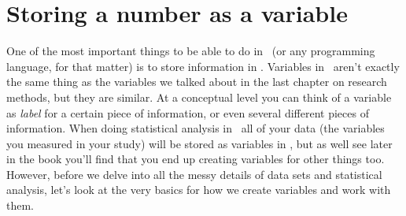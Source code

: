 \section{Storing a number as a variable~\label{sec:assign}}

One of the most important things to be able to do in \R\ (or any programming language, for that matter) is to store information in . Variables in \R\ aren't exactly the same thing as the variables we talked about in the last chapter on research methods, but they are similar. At a conceptual level you can think of a variable as {\it label} for a certain piece of information, or even several different pieces of information. When doing statistical analysis in \R\ all of your data (the variables you measured in your study) will be stored as variables in \R, but as well see later in the book you'll find that you end up creating variables for other things too. However, before we delve into all the messy details of data sets and statistical analysis, let's look at the very basics for how we create variables and work with them. 


